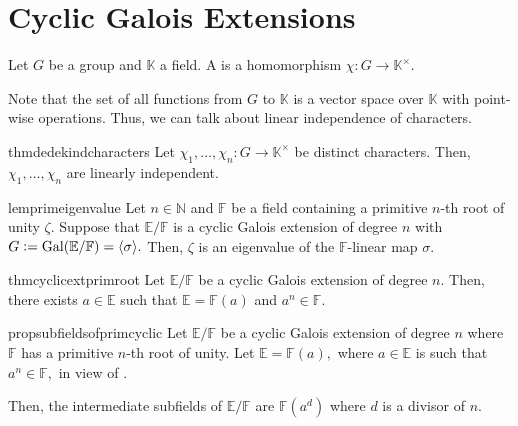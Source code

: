 \section{Cyclic Galois Extensions}
\begin{defn}%
	Let $G$ be a group and $\mathbb{K}$ a field. A  is a homomorphism $\chi : G \to \mathbb{K}^\times.$
\end{defn}

\begin{rem}
	Note that the set of all functions from $G$ to $\mathbb{K}$ is a vector space over $\mathbb{K}$ with point-wise operations. Thus, we can talk about linear independence of characters.
\end{rem}

\begin{restatable}[Dedekind]{thm}{dedekindcharacters}
\label{thm:dedekindcharacters}
	Let $\chi_1, \ldots, \chi_n : G \to \mathbb{K}^\times$ be distinct characters. Then, $\chi_1, \ldots, \chi_n$ are linearly independent. \hfill\hyperref[thm:dedekindcharacters2]{\downsym}
\end{restatable}

\begin{restatable}[]{lem}{primeigenvalue}
\label{lem:primeigenvalue}
	Let $n \in \mathbb{N}$ and $\mathbb{F}$ be a field containing a primitive $n$-th root of unity $\zeta.$ Suppose that $\mathbb{E}/\mathbb{F}$ is a cyclic Galois extension of degree $n$ with $G \vcentcolon= \operatorname{Gal}(\mathbb{E}/\mathbb{F}) = \langle \sigma\rangle.$ Then, $\zeta$ is an eigenvalue of the $\mathbb{F}$-linear map $\sigma.$ \hfill\hyperref[lem:primeigenvalue2]{\downsym}
\end{restatable}

\begin{restatable}[]{thm}{cyclicextprimroot}
\label{thm:cyclicextprimroot}
	Let $\mathbb{E}/\mathbb{F}$ be a cyclic Galois extension of degree $n.$ Then, there exists $a \in \mathbb{E}$ such that $\mathbb{E} = \mathbb{F}(a)$ and $a^n \in \mathbb{F}.$ \hfill\hyperref[thm:cyclicextprimroot2]{\downsym}
\end{restatable}

\begin{restatable}[]{prop}{subfieldsofprimcyclic}
\label{prop:subfieldsofprimcyclic}
	Let $\mathbb{E}/\mathbb{F}$ be a cyclic Galois extension of degree $n$ where $\mathbb{F}$ has a primitive $n$-th root of unity. Let $\mathbb{E} = \mathbb{F}(a),$ where $a \in \mathbb{E}$ is such that $a^n \in \mathbb{F},$ in view of .

	Then, the intermediate subfields of $\mathbb{E}/\mathbb{F}$ are $\mathbb{F}(a^d)$ where $d$ is a divisor of $n.$ \hfill\hyperref[prop:subfieldsofprimcyclic2]{\downsym}
\end{restatable}

